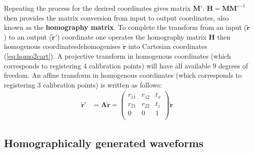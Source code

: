 Repeating the process for the desired coordinates gives matrix $\textbf{M}'$.
$\textbf{H} = \textbf{M} {\textbf{M}'}^{-1}$ then provides the matrix conversion from input to output coordinates, also known as the \textbf{homography matrix}.
To complete the transform from an input ($\widetilde{\textbf{r}}$) to an output ($\widetilde{\textbf{r}}'$) coordinate one operates the \gls{homography} matrix $\textbf{H}$ %
then \gls{homogenous coordinates}{dehomogenises} $\widetilde{\textbf{r}}$ into Cartesian coordinates (\eqref{eq:homo2cart}).
A projective transform in \gls{homogenous coordinates} (which corresponds to registering 4 calibration points) will have all available 9 degrees of freedom.
An affine transform in \gls{homogenous coordinates} (which corresponds to registering 3 calibration points) is written as follows:
\begin{align}
\widetilde{\textbf{r}}' &= \textbf{A} \widetilde{\textbf{r}}
= \begin{pmatrix}
r_{11} & r_{12} & t_x \\
r_{21} & r_{22} & t_z \\
0 & 0 & 1\\
\end{pmatrix}\widetilde{\textbf{r}}
\end{align}


\subsection{Homographically generated waveforms}

